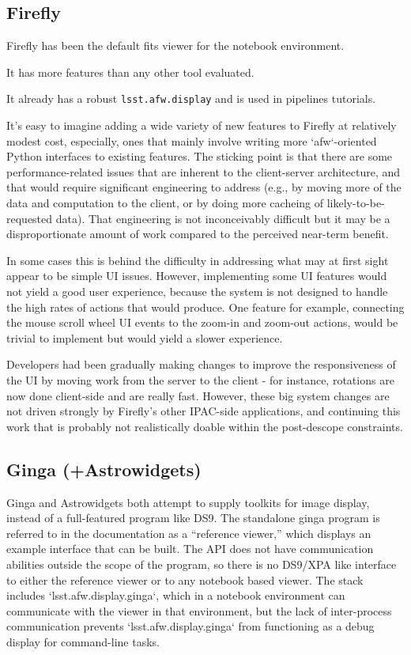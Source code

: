 
\subsection{Firefly}

Firefly has been the default fits viewer for the notebook environment. 

It has more features than any other tool evaluated. 

It already has a robust \texttt{lsst.afw.display} and is used in pipelines tutorials. 

It's easy to imagine adding a wide variety of new features to Firefly at relatively modest cost, especially, ones that mainly involve writing more `afw`-oriented Python interfaces to existing features.
The sticking point is that there are some performance-related issues that are inherent to the client-server architecture, and that would require significant engineering to address (e.g., by moving more of the data and computation to the client, or by doing more cacheing of likely-to-be-requested data).
That engineering is not inconceivably difficult  but it may be a disproportionate amount of work compared to the perceived near-term benefit. 

In some cases this is behind the difficulty in addressing what may at first sight appear to be simple UI issues.
However, implementing some UI features would not yield a good user experience, because the system is not designed to handle the high rates of actions that would produce.
One feature for example, connecting the mouse scroll wheel UI events to the zoom-in and zoom-out actions, would be trivial to implement but would yield a slower experience. 

Developers had been gradually making changes to improve the responsiveness of the UI by moving work from the server to the client - for instance, rotations are now done client-side and are really fast.
However, these big system changes are not driven strongly by Firefly's other IPAC-side applications, and continuing this work that is probably not realistically doable within the post-descope constraints.

\subsection{Ginga (+Astrowidgets)}

Ginga and Astrowidgets both attempt to supply toolkits for image display, instead of a full-featured program like DS9.  The standalone ginga program is referred to in the documentation as a ``reference viewer,'' which displays an example interface that can be built.  The API does not have communication abilities outside the scope of the program, so there is no DS9/XPA like interface to either the reference viewer or to any notebook based viewer.  The stack includes `lsst.afw.display.ginga`, which in a notebook environment can communicate with the viewer in that environment, but the lack of inter-process communication prevents `lsst.afw.display.ginga` from functioning as a debug display for command-line tasks.

